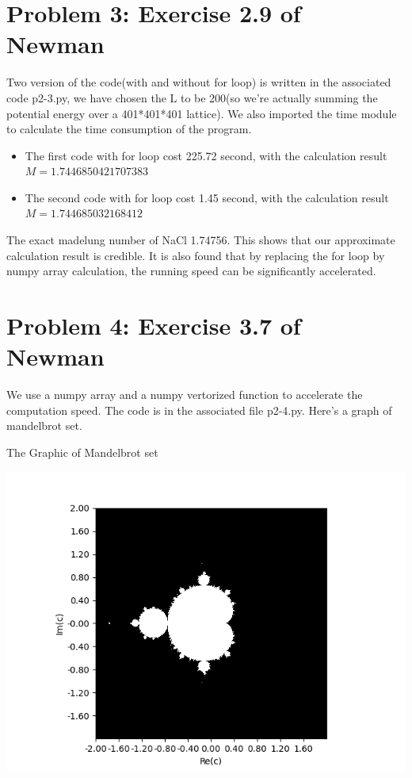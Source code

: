 \documentclass[letterpaper,12pt]{article}
\begin{document}
\section{Problem 3: Exercise 2.9 of Newman}

Two version of the code(with and without for loop) is written in the associated code p2-3.py, we have chosen the L to be 200(so we're actually summing the potential energy over a 401*401*401 lattice). We also imported the time module to calculate the time consumption of the program. \\

\begin{itemize}
    \item The first code with for loop cost 225.72 second, with the calculation result $M=1.7446850421707383$
    \item The second code with for loop cost 1.45 second, with the calculation result $M=1.744685032168412$
\end{itemize}


The exact madelung number of NaCl 1.74756. This shows that our approximate calculation result is credible. It is also found that by replacing the for loop by numpy array calculation, the running speed can be significantly accelerated.\\


\section{Problem 4: Exercise 3.7 of Newman}

We use a numpy array and a numpy vertorized function to accelerate the computation speed. The code is in the associated file p2-4.py. Here's a graph of mandelbrot set.


\begin{table}[!h]
    \centering
    \caption{The Graphic of Mandelbrot set}
    \includegraphics{ps2-4.png}
    \label{plot}%
\end{table}%
\end{document}
